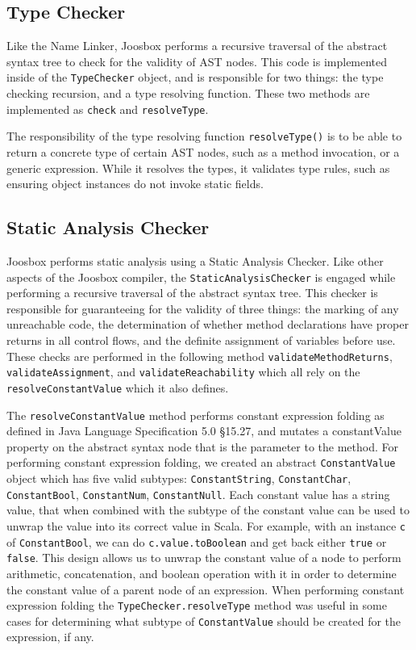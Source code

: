 \documentclass[letterpaper]{article}
\begin{document}
  \subsection{Type Checker}

  Like the Name Linker, Joosbox performs a recursive traversal of the abstract
  syntax tree to check for the validity of AST nodes. This code is implemented
  inside of the {\tt TypeChecker} object, and is responsible for two things: the
  type checking recursion, and a type resolving function. These two methods are
  implemented as {\tt check} and {\tt resolveType}.

  The responsibility of the type resolving function {\tt resolveType()} is to be
  able to return a concrete type of certain AST nodes, such as a method
  invocation, or a generic expression. While it resolves the types, it validates
  type rules, such as ensuring object instances do not invoke static fields.


  \subsection{Static Analysis Checker}

  Joosbox performs static analysis using a Static Analysis Checker. Like other
  aspects of the Joosbox compiler, the {\tt StaticAnalysisChecker} is engaged 
  while performing a recursive traversal of the abstract syntax tree. This
  checker is responsible for guaranteeing for the validity of three things: the
  marking of any unreachable code, the determination of whether method
  declarations have proper returns in all control flows, and the definite
  assignment of variables before use. These checks are performed in the
  following method {\tt validateMethodReturns},
  {\tt validateAssignment}, and {\tt validateReachability}
  which all rely on the {\tt resolveConstantValue} which it also defines.

  The {\tt resolveConstantValue} method performs constant expression folding as
  defined in  Java Language Specification 5.0 \S 15.27, and mutates a
  constantValue property on the abstract syntax node that is the parameter to
  the method. For performing constant expression folding, we created an abstract
  {\tt ConstantValue} object which has five valid subtypes: {\tt ConstantString},
  {\tt ConstantChar}, {\tt ConstantBool}, {\tt ConstantNum}, {\tt ConstantNull}.
  Each constant value has a string value, that when combined with the subtype of
  the constant value can be used to unwrap the value into its correct value in
  Scala. For example, with an instance {\tt c} of {\tt ConstantBool}, we can do
  {\tt c.value.toBoolean} and get back either {\tt true} or {\tt false}. This
  design allows us to unwrap the constant value of a node to perform arithmetic,
  concatenation, and boolean operation with it in order to determine the
  constant value of a parent node of an expression. When performing constant
  expression folding the {\tt TypeChecker.resolveType} method was useful in some
  cases for determining what subtype of {\tt ConstantValue} should be created for
  the expression, if any.
\end{document}
